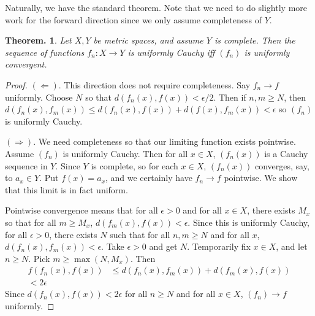 \documentclass[11pt, a4paper]{memoir}
\theoremstyle{change}
\newtheorem{theorem}{Theorem.}[section]
\theoremstyle{plain}
\theoremstyle{nonumberplain}
\newtheorem{proof}{Proof}
\numberwithin{equation}{section}
\begin{document}
Naturally, we have the standard theorem.
Note that we need to do slightly more work for the forward direction since we only assume completeness of $Y$.
\begin{theorem}
    Let $X,Y$ be metric spaces, and assume $Y$ is complete. Then the sequence of functions $f_n:X\to Y$ is uniformly
    Cauchy iff $(f_n)$ is uniformly convergent.
\end{theorem}
\begin{proof}
    $(\Leftarrow)$.
    This direction does not require completeness.
    Say $f_n\to f$ uniformly.
    Choose $N$ so that $d(f_n(x),f(x))<\epsilon/2$.
    Then if $n,m\geq N$, then $d(f_n(x),f_m(x))\leq d(f_n(x),f(x))+d(f(x),f_m(x))<\epsilon$ so $(f_n)$ is uniformly Cauchy.

    $(\Rightarrow)$.
    We need completeness so that our limiting function exists pointwise.
    Assume $(f_n)$ is uniformly Cauchy.
    Then for all $x\in X$, $(f_n(x))$ is a Cauchy sequence in $Y$.
    Since $Y$ is complete, so for each $x\in X$, $(f_n(x))$ converges, say, to $a_x\in Y$.
    Put $f(x)=a_x$, and we certainly have $f_n\to f$ pointwise.
    We show that this limit is in fact uniform.

    Pointwise convergence means that for all $\epsilon>0$ and for all $x\in X$, there exists $M_x$ so that for all $m\geq M_x$,
    $d(f_m(x),f(x))<\epsilon$. Since this is uniformly Cauchy, for all $\epsilon>0$, there exists $N$ such that
    for all $n,m\geq N$ and for all $x$, $d(f_n(x),f_m(x))<\epsilon$. Take $\epsilon>0$ and get $N$. Temporarily fix
    $x\in X$, and let $n\geq N$. Pick $m\geq\max(N,M_x)$. Then
    \begin{align*}
        f(f_n(x),f(x)) &\leq d(f_n(x),f_m(x))+d(f_m(x),f(x))\\
        <2\epsilon
    \end{align*}
    Since $d(f_n(x),f(x))<2\epsilon$ for all $n\geq N$ and for all $x\in X$, $(f_n)\to f$ uniformly.
\end{proof}
\end{document}
